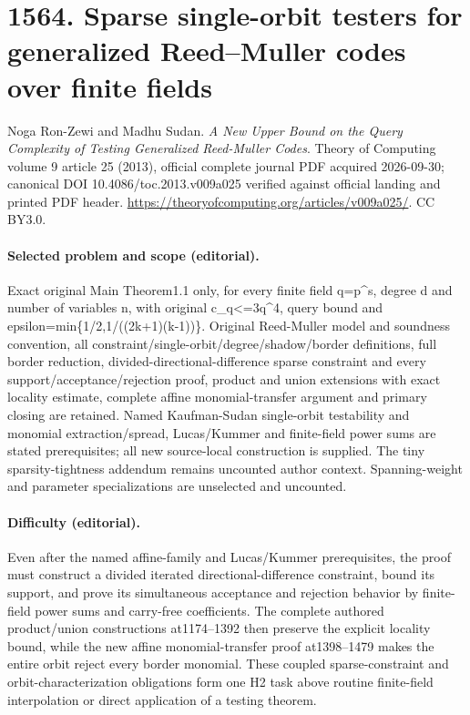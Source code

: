 \documentclass[10pt]{article}
\theoremstyle{definition}
\numberwithin{equation}{section}
\begin{document}
\begingroup\raggedright
\section*{1564. Sparse single-orbit testers for generalized Reed–Muller codes over finite fields}
Noga Ron-Zewi and Madhu Sudan. \emph{A New Upper Bound on the Query Complexity of Testing Generalized Reed-Muller Codes}. Theory of Computing volume 9 article 25 (2013), official complete journal PDF acquired 2026-09-30; canonical DOI 10.4086/toc.2013.v009a025 verified against official landing and printed PDF header. \url{https://theoryofcomputing.org/articles/v009a025/}. CC BY3.0.
\paragraph{Selected problem and scope (editorial).} Exact original Main Theorem1.1 only, for every finite field q=p\textasciicircum{}s, degree d and number of variables n, with original c\_q<=3q\textasciicircum{}4, query bound and epsilon=min\{1/2,1/((2k+1)(k-1))\}. Original Reed-Muller model and soundness convention, all constraint/single-orbit/degree/shadow/border definitions, full border reduction, divided-directional-difference sparse constraint and every support/acceptance/rejection proof, product and union extensions with exact locality estimate, complete affine monomial-transfer argument and primary closing are retained. Named Kaufman-Sudan single-orbit testability and monomial extraction/spread, Lucas/Kummer and finite-field power sums are stated prerequisites; all new source-local construction is supplied. The tiny sparsity-tightness addendum remains uncounted author context. Spanning-weight and parameter specializations are unselected and uncounted.
\paragraph{Difficulty (editorial).} Even after the named affine-family and Lucas/Kummer prerequisites, the proof must construct a divided iterated directional-difference constraint, bound its support, and prove its simultaneous acceptance and rejection behavior by finite-field power sums and carry-free coefficients. The complete authored product/union constructions at1174–1392 then preserve the explicit locality bound, while the new affine monomial-transfer proof at1398–1479 makes the entire orbit reject every border monomial. These coupled sparse-constraint and orbit-characterization obligations form one H2 task above routine finite-field interpolation or direct application of a testing theorem.
\end{document}

